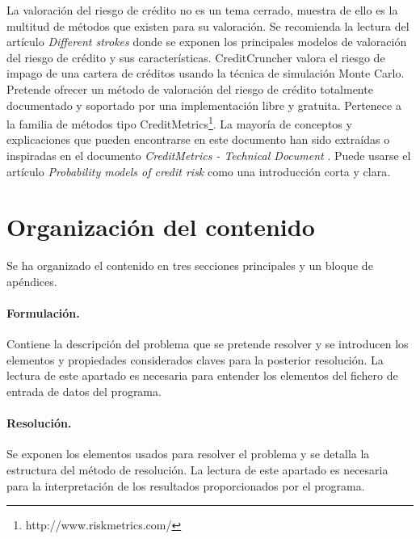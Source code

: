 La valoraci\'on del riesgo de cr\'edito no es un tema cerrado, muestra de ello 
es la multitud de m\'etodos que existen para su valoraci\'on. Se recomienda la 
lectura del art\'iculo \emph{Different strokes} \cite{Risk:Dif_Str} donde se 
exponen los principales modelos de valoraci\'on del riesgo de cr\'edito y sus 
caracter\'isticas. 
\newline
\newline
CreditCruncher valora el riesgo de impago de una cartera de cr\'editos usando la 
t\'ecnica de simulaci\'on Monte Carlo. Pretende ofrecer un m\'etodo de valoraci\'on 
del riesgo de cr\'edito totalmente documentado y soportado por una implementaci\'on 
libre y gratuita. Pertenece a la familia de m\'etodos tipo 
CreditMetrics\footnote{http://www.riskmetrics.com/}.
\newline
\newline
La mayor\'ia de conceptos y explicaciones que pueden 
encontrarse en este documento han sido extra\'idas o inspiradas en el documento 
\emph{CreditMetrics - Technical Document} \cite{CreditMetrics:Tech_Doc}.
Puede usarse el art\'iculo \emph{Probability models of credit risk} \cite{cbs:glasser} 
como una introducci\'on corta y clara.


\section{Organizaci\'on del contenido}

Se ha organizado el contenido en tres secciones principales y un bloque de
ap\'endices.

\paragraph{Formulaci\'on.} Contiene la descripci\'on del problema que se
pretende resolver y se introducen los elementos y propiedades considerados
claves para la posterior resoluci\'on. La lectura de este apartado es necesaria para
entender los elementos del fichero de entrada de datos del programa.

\paragraph{Resoluci\'on.} Se exponen los elementos usados para
resolver el problema y se detalla la estructura del m\'etodo de resoluci\'on.
La lectura de este apartado es necesaria para la interpretaci\'on de los 
resultados proporcionados por el programa.

